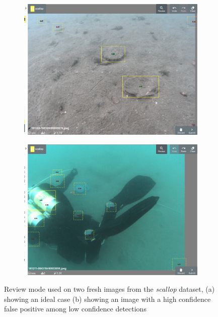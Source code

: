 \begin{figure}[thb]
\centering
\begin{subfigure}[t]{0.5\linewidth}
  \includegraphics[width=1.0\linewidth]{figures/annotation/scallop/review_mode.png}
  \caption{}
  \label{fig:scallop_review_a}
\end{subfigure}%
\begin{subfigure}[t]{0.5\linewidth}
  \includegraphics[width=1.0\linewidth]{figures/annotation/scallop/diver.png}
  \caption{}
  \label{fig:scallop_diver}
\end{subfigure}
\caption{Review mode used on two fresh images from the \emph{scallop} dataset, (a) showing an ideal case (b) showing an image with a high confidence false positive among low confidence detections}
\label {fig:scallop_review}
\end{figure}


